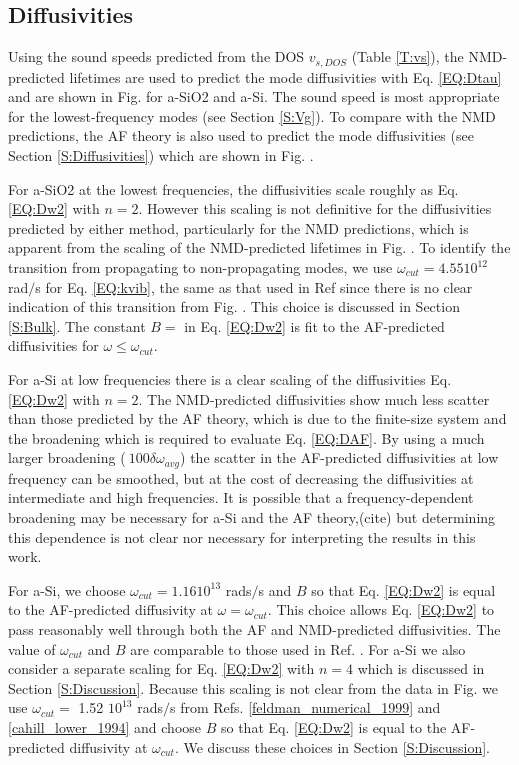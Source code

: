 \documentclass[aps,prb,twocolumn,superscriptaddress,footinbib,amsmath,amssymb,floatfix]{revtex4}
\begin{document}
\subsection{\label{S:Diffusivities}Diffusivities}

Using the sound speeds predicted 
from the DOS $v_{s,DOS}$ (Table \ref{T:vs}), the NMD-predicted lifetimes 
are used to predict the mode diffusivities with Eq. \eqref{EQ:Dtau} 
and are shown in Fig. for a-SiO2 and a-Si. 
The sound speed is most appropriate  
for the lowest-frequency modes (see Section \ref{S:Vg}). To compare with 
the NMD predictions, the AF theory is also used to predict the mode 
diffusivities (see Section \ref{S:Diffusivities}) which are shown 
in Fig. . 

For a-SiO2 at the lowest frequencies, the 
diffusivities scale roughly as Eq. \eqref{EQ:Dw2} with $n=2$.  
However this 
scaling is not definitive for the diffusivities predicted by either 
method, particularly for the NMD predictions, which 
is apparent from the scaling of the NMD-predicted lifetimes 
in Fig. . To identify the transition from propagating 
to non-propagating modes, we use $\omega_{cut} = 4.55 10^{12}$ rad$/$s 
for Eq. \eqref{EQ:kvib}, 
the same as that used in Ref  since 
there is no clear indication of this transition from Fig. . 
This choice is discussed in Section \ref{S:Bulk}. The constant 
$B=$ in Eq. \eqref{EQ:Dw2} 
is fit to the AF-predicted diffusivities for 
$\omega \le \omega_{cut}$.

For a-Si at low frequencies there is a clear scaling of the 
diffusivities Eq. \eqref{EQ:Dw2} with $n=2$.  
The NMD-predicted diffusivities show much less 
scatter than those predicted by the AF theory, which is due to 
the finite-size system and the broadening which is required to evaluate 
Eq. \eqref{EQ:DAF}.\cite{feldman_thermal_1993} By using a much larger 
broadening ($~100\delta\omega_{avg}$) the scatter in the AF-predicted 
diffusivities at low frequency can be smoothed, but at the cost of 
decreasing the diffusivities at intermediate and high frequencies. 
It is possible that a frequency-dependent broadening may be necessary 
for a-Si and the AF theory,(cite)  
but determining this dependence is not clear nor necessary for 
interpreting the results in this work.  

For a-Si, we choose $\omega_{cut}=1.16 10^13$ rads$/$s 
and $B$ so that Eq. \eqref{EQ:Dw2} is equal 
to the AF-predicted diffusivity at $\omega=\omega_{cut}$. This choice 
allows Eq. \eqref{EQ:Dw2} to pass reasonably well through both the AF and NMD-predicted 
diffusivities.  The value of $\omega_{cut}$ and $B$ are comparable to 
those used in Ref. .  For a-Si we also consider a separate scaling 
for Eq. \eqref{EQ:Dw2} with $n=4$ which is discussed in Section \ref{S:Discussion}. 
Because this scaling is not clear from the data in Fig. we use 
$\omega_{cut} = $ 1.52 $10^13$ rads$/$s  
from Refs. \ref{feldman_numerical_1999} and \ref{cahill_lower_1994} 
and choose $B$ so that Eq. \eqref{EQ:Dw2} is equal to the AF-predicted 
diffusivity at $\omega_{cut}$. We discuss these choices in 
Section \ref{S:Discussion}. 
\end{document}
